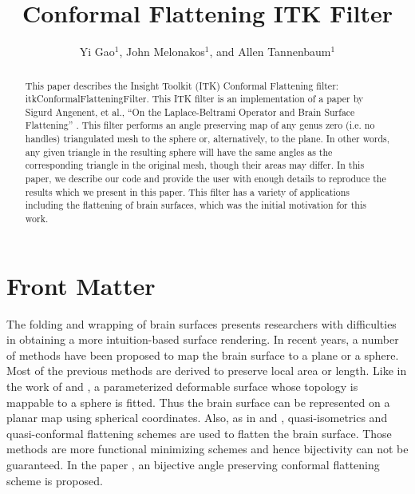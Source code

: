 \documentclass{InsightArticle}
\title{Conformal Flattening ITK Filter}
\author{Yi Gao$^{1}$, John Melonakos$^{1}$, and Allen Tannenbaum$^{1}$}
\begin{document}
	\newif\ifpdf
	\ifx\pdfoutput\undefined
  \pdffalse
	\else
  \pdftrue
	\fi


	\ifpdf
	\else
  \DeclareGraphicsExtensions{.eps,.jpg,.gif,.tiff,.bmp,.png}
  \DeclareGraphicsRule{.jpg}{eps}{.jpg.bb}{`convert #1 eps:-}
  \DeclareGraphicsRule{.gif}{eps}{.gif.bb}{`convert #1 eps:-}
  \DeclareGraphicsRule{.tiff}{eps}{.tiff.bb}{`convert #1 eps:-}
  \DeclareGraphicsRule{.bmp}{eps}{.bmp.bb}{`convert #1 eps:-}
  \DeclareGraphicsRule{.png}{eps}{.png.bb}{`convert #1 eps:-}
	\fi


	\maketitle


	\ifhtml
	\chapter*{Front Matter\label{front}}
	\fi


	\begin{abstract}
		\noindent This paper describes the Insight Toolkit (ITK) Conformal
		Flattening filter: itkConformalFlatteningFilter. This ITK filter is an
		implementation of a paper by Sigurd Angenent, et al., ``On the
		Laplace-Beltrami Operator and Brain Surface Flattening''
		\cite{angenent1999lbo}. This filter performs an angle preserving map of any
		genus zero (i.e. no handles) triangulated mesh to the sphere or,
		alternatively, to the plane. In other words, any given triangle in the
		resulting sphere will have the same angles as the corresponding
		triangle in the original mesh, though their areas may differ. In this
		paper, we describe our code and provide the user with enough details
		to reproduce the results which we present in this paper. This filter
		has a variety of applications including the flattening of brain
		surfaces, which was the initial motivation for this work.
	\end{abstract}

	\tableofcontents

	The folding and wrapping of brain surfaces presents researchers with
	difficulties in obtaining a more intuition-based surface
	rendering. In recent years, a number of methods have been proposed
	to map the brain surface to a plane or a sphere. Most of the
	previous methods are derived to preserve local area or length. Like
	in the work of \cite{davatzikos1996} and \cite{macDonald1994}, 
	a parameterized deformable surface whose topology is mappable to a sphere
	is fitted. Thus the brain surface can be represented on a planar map 
	using spherical coordinates. Also, as in \cite{carman1995} and \cite{schwartz1989}, 
	quasi-isometrics and quasi-conformal flattening schemes are used 
	to flatten the brain surface. Those methods are more functional
	minimizing schemes and hence bijectivity can not be guaranteed.	
	In the paper \cite{angenent1999lbo}, an bijective angle preserving
	conformal flattening scheme is proposed.
\end{document}

